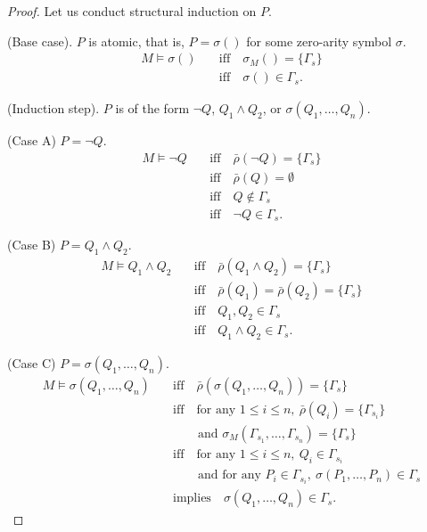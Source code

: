 \documentclass{article}
\theoremstyle{plain}
\begin{document}
\begin{proof}
Let us conduct structural induction on $P$.

(Base case). $P$ is atomic, that is, $P = \sigma()$ for some zero-arity symbol $\sigma$.
\begin{align*}
M \vDash \sigma() \quad &\text{iff} \quad 
\sigma_M() = \{\Gamma_s\} \\
&\text{iff} \quad \sigma() \in \Gamma_s.
\end{align*}

(Induction step). $P$ is of the form $\neg Q$, $Q_1 \wedge Q_2$, or $\sigma(Q_1,\dots,Q_n)$.

\quad (Case A) $P = \neg Q$.
\begin{align*}
M \vDash \neg Q \quad &\text{iff} \quad
\bar{\rho}(\neg Q) = \{\Gamma_s\} \\
&\text{iff} \quad \bar{\rho}(Q) = \emptyset \\
&\text{iff} \quad Q \not \in \Gamma_s \\
&\text{iff} \quad \neg Q \in \Gamma_s.
\end{align*}

\quad (Case B) $P = Q_1 \wedge Q_2$.
\begin{align*}
M \vDash Q_1 \wedge Q_2 \quad &\text{iff} \quad
\bar{\rho}(Q_1 \wedge Q_2) = \{\Gamma_s\} \\
&\text{iff} \quad \bar{\rho}(Q_1) = \bar{\rho}(Q_2) = \{\Gamma_s\} \\
&\text{iff} \quad Q_1, Q_2 \in \Gamma_s \\
&\text{iff} \quad Q_1 \wedge Q_2 \in \Gamma_s.
\end{align*}

\quad (Case C) $P = \sigma(Q_1,\dots,Q_n)$.
\begin{align*}
M \vDash \sigma(Q_1,\dots,Q_n) \quad &\text{iff} \quad
\bar{\rho}(\sigma(Q_1,\dots,Q_n)) = \{\Gamma_s\} \\
&\text{iff} \quad \text{for any } 1 \le i \le n,\ \bar{\rho}(Q_i) = \{\Gamma_{s_i}\}\\
&\quad \quad \text{and } \sigma_M(\Gamma_{s_1}, \dots, \Gamma_{s_n}) = \{\Gamma_s\}\\
&\text{iff} \quad \text{for any } 1 \le i \le n,\ Q_i \in \Gamma_{s_i} \\
&\quad \quad \text{and } \text{for any } P_i \in \Gamma_{s_i}, \ 
\sigma(P_1, \dots, P_n) \in \Gamma_s \\
&\text{implies} \quad \sigma(Q_1,\dots,Q_n) \in \Gamma_s.
\end{align*}


\end{proof}
\end{document}
